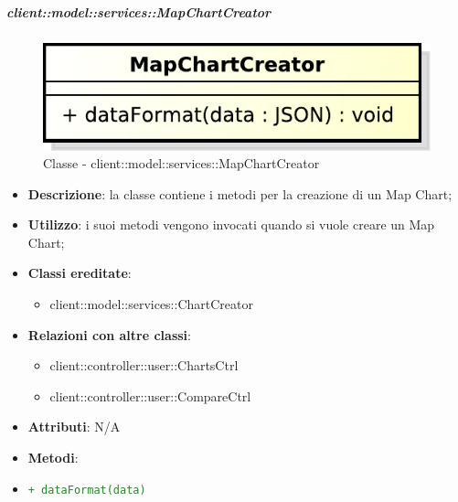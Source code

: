 		\subparagraph{client::model::services::MapChartCreator} %
		\label{subp:mapchartcreator}
			\begin{figure}[htbp]
				\centering
				\centerline{\includegraphics[scale=0.7]{./images/client/classes/model/map_chart_creator.pdf}}
				\caption{Classe - client::model::services::MapChartCreator}
			\end{figure}
			\begin{itemize}
				\item \textbf{Descrizione}: la classe contiene i metodi per la creazione di un Map Chart;
				\item \textbf{Utilizzo}: i suoi metodi vengono invocati quando si vuole creare un Map Chart;
				\item \textbf{Classi ereditate}:
					\begin{itemize}
						\item client::model::services::ChartCreator
					\end{itemize}
				\item \textbf{Relazioni con altre classi}:
					\begin{itemize}
						\item client::controller::user::ChartsCtrl
						\item client::controller::user::CompareCtrl
					\end{itemize}
				\item \textbf{Attributi}: N/A
				\item \textbf{Metodi}: 
					\item \textcolor{forestgreen}{\texttt{+ dataFormat(data)}}
			\end{itemize}

